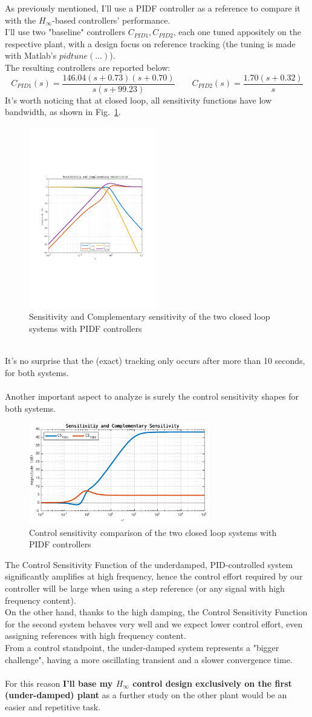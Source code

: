 \documentclass[a4paper, 12pt]{article}
\def\FigureTwo{\centering\includegraphics[width=0.5\textwidth]{Figures/fig02.pdf}}
\def\FigureThree{\centering\includegraphics[width=0.7\textwidth]{Figures/fig03.pdf}}
\begin{document}
As previously mentioned, I'll use a PIDF controller as a reference to compare it with the $H_\infty$-based controllers' performance.\\
I'll use two "baseline" controllers $C_{PID1},C_{PID2}$, each one tuned appositely on the respective plant, with a design focus on reference tracking (the tuning is made with Matlab's $pidtune(\dots)$).\\
The resulting controllers are reported below:
\begin{equation}
        C_{PID1}(s) = \frac{146.04 (s+0.73) (s+0.70)}
        {s (s+99.23)} \qquad   
        C_{PID2}(s) = \frac{1.70 (s+0.32)}
        {s}
\label{eq:PIDF Controllers}
\end{equation}
It's worth noticing that at closed loop, all sensitivity functions have low bandwidth, as shown in Fig.~\ref{fig:fig02}.
\begin{figure}[h!]
    \FigureTwo
    \caption{Sensitivity and Complementary sensitivity of the two closed loop systems with PIDF controllers}
    \label{fig:fig02}
\end{figure}
\\It's no surprise that the (exact) tracking only occurs after more than 10 seconds, for both systems. \\\\
Another important aspect to analyze is surely the control sensitivity shapes for both systems.
\begin{figure}[h!]
    \FigureThree
    \caption*{Control sensitivity comparison of the two closed loop systems with PIDF controllers}
\end{figure}
The Control Sensitivity Function of the underdamped, PID-controlled system significantly amplifies at high frequency, hence the control effort required by our controller will be large when using a step reference (or any signal with high frequency content).
\\
On the other hand, thanks to the high damping, the Control Sensitivity Function for the second system behaves very well and we expect lower control effort, even assigning references with high frequency content.
\\
From a control standpoint, the under-damped system represents a "bigger challenge", having a more oscillating transient and a slower convergence time.
\\\\
For this reason \textbf{I'll base my $H_\infty$ control design exclusively on the first (under-damped) plant} as a further study on the other plant would be an easier and repetitive task.
\clearpage
\end{document}
